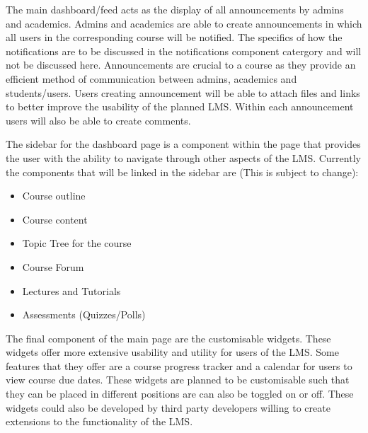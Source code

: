 The main dashboard/feed acts as the display of all announcements by admins and academics. Admins and academics are able to create announcements in which all users in the corresponding course will be notified.
The specifics of how the notifications are to be discussed in the notifications component catergory and will not be discussed here. 
Announcements are crucial to a course as they provide an efficient method of communication between admins, academics and students/users.
Users creating announcement will be able to attach files and links to better improve the usability of the planned LMS.
Within each announcement users will also be able to create comments.

The sidebar for the dashboard page is a component within the page that provides the user with the ability to navigate through other aspects of the LMS.
Currently the components that will be linked in the sidebar are (This is subject to change):
\begin{itemize}
    \item Course outline
    \item Course content
    \item Topic Tree for the course
    \item Course Forum
    \item Lectures and Tutorials
    \item Assessments (Quizzes/Polls)
\end{itemize}

The final component of the main page are the customisable widgets. These widgets offer more extensive usability and utility for users of the LMS.
Some features that they offer are a course progress tracker and a calendar for users to view course due dates. 
These widgets are planned to be customisable such that they can be placed in different positions are can also be toggled on or off.
These widgets could also be developed by third party developers willing to create extensions to the functionality of the LMS.


